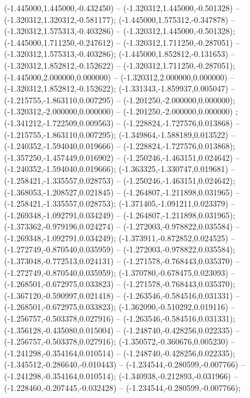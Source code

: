  (-1.445000,1.445000,-0.432450) -- (-1.320312,1.445000,-0.501328) -- (-1.320312,1.320312,-0.581177);
 (-1.445000,1.575312,-0.347878) -- (-1.320312,1.575313,-0.403286) -- (-1.320312,1.445000,-0.501328);
 (-1.445000,1.711250,-0.247612) -- (-1.320312,1.711250,-0.287051) -- (-1.320312,1.575313,-0.403286);
 (-1.445000,1.852812,-0.131653) -- (-1.320312,1.852812,-0.152622) -- (-1.320312,1.711250,-0.287051);
 (-1.445000,2.000000,0.000000) -- (-1.320312,2.000000,0.000000) -- (-1.320312,1.852812,-0.152622);
 (-1.331343,-1.859937,0.005047) -- (-1.215755,-1.863110,0.007295) -- (-1.201250,-2.000000,0.000000);
 (-1.320312,-2.000000,0.000000) -- (-1.201250,-2.000000,0.000000) ;
 (-1.341212,-1.722509,0.009563) -- (-1.228824,-1.727576,0.013868) -- (-1.215755,-1.863110,0.007295);
 (-1.349864,-1.588189,0.013522) -- (-1.240352,-1.594040,0.019666) -- (-1.228824,-1.727576,0.013868);
 (-1.357250,-1.457449,0.016902) -- (-1.250246,-1.463151,0.024642) -- (-1.240352,-1.594040,0.019666);
 (-1.363325,-1.330747,0.019681) -- (-1.258421,-1.335557,0.028753) -- (-1.250246,-1.463151,0.024642);
 (-1.368053,-1.208527,0.021845) -- (-1.264807,-1.211898,0.031965) -- (-1.258421,-1.335557,0.028753);
 (-1.371405,-1.091211,0.023379) -- (-1.269348,-1.092791,0.034249) -- (-1.264807,-1.211898,0.031965);
 (-1.373362,-0.979196,0.024274) -- (-1.272003,-0.978822,0.035584) -- (-1.269348,-1.092791,0.034249);
 (-1.373911,-0.872852,0.024525) -- (-1.272749,-0.870540,0.035959) -- (-1.272003,-0.978822,0.035584);
 (-1.373048,-0.772513,0.024131) -- (-1.271578,-0.768443,0.035370) -- (-1.272749,-0.870540,0.035959);
 (-1.370780,-0.678475,0.023093) -- (-1.268501,-0.672975,0.033823) -- (-1.271578,-0.768443,0.035370);
 (-1.367120,-0.590997,0.021418) -- (-1.263546,-0.584516,0.031331) -- (-1.268501,-0.672975,0.033823);
 (-1.362090,-0.510292,0.019116) -- (-1.256757,-0.503378,0.027916) -- (-1.263546,-0.584516,0.031331);
 (-1.356128,-0.435080,0.015004) -- (-1.248740,-0.428256,0.022335) -- (-1.256757,-0.503378,0.027916);
 (-1.350572,-0.360676,0.005230) -- (-1.241298,-0.354164,0.010514) -- (-1.248740,-0.428256,0.022335);
 (-1.345512,-0.286640,-0.010443) -- (-1.234544,-0.280599,-0.007766) -- (-1.241298,-0.354164,0.010514);
 (-1.340938,-0.212893,-0.031966) -- (-1.228460,-0.207445,-0.032428) -- (-1.234544,-0.280599,-0.007766);
